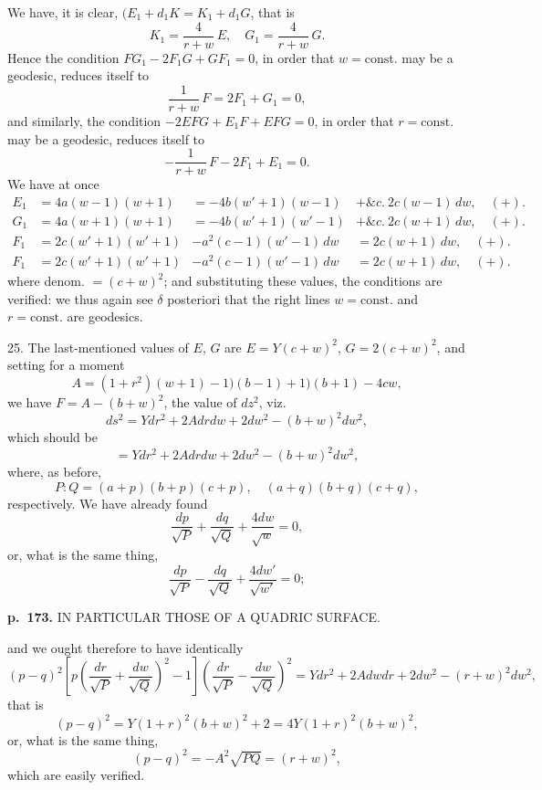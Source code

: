 \documentclass[11pt,a4paper]{book}
\begin{document}
We have, it is clear, $(E_1 + d_1 K = K_1 + d_1 G$, that is
\[
K_1 = \frac{4}{r+w}\, E, \quad G_1 = \frac{4}{r+w}\, G.
\]
Hence the condition $F G_1 - 2 F_1 G + G F_1 = 0$, in order that $w = \mathrm{const.}$ may be a geodesic, reduces itself to
\[
\frac{1}{r+w}\, F = 2 F_1 + G_1 = 0,
\]
and similarly, the condition $-2E F G + E_1 F + E F G = 0$, in order that $r = \mathrm{const.}$ may be a geodesic, reduces itself to
\[
-\frac{1}{r+w}\, F - 2F_1 + E_1 = 0.
\]
We have at once
\begin{align*}
E_1 &= 4a(w - 1)(w + 1)  &= -4b(w' + 1)(w - 1)  &+ \&c.\ 2c(w - 1)\,dw,  \quad (+).
\\
G_1 &= 4a(w + 1)(w + 1)  &= -4b(w' + 1)(w' - 1)  &+ \&c.\ 2c(w + 1)\,dw,  \quad (+).
\\
F_1 &= 2c(w' + 1)(w' + 1)  &- a^2(c - 1)(w' - 1)\, dw  &= 2c(w + 1)\,dw,  \quad (+).
\\
F_1 &= 2c(w' + 1)(w' + 1)  &- a^2(c - 1)(w' - 1)\, dw  &= 2c(w + 1)\,dw,  \quad (+).
\end{align*}
where denom. $=(c+w)^2$; and substituting these values, the conditions are verified: we thus again see $\delta$ posteriori that the right lines $w = \mathrm{const.}$ and $r = \mathrm{const.}$ are geodesics.

25. The last-mentioned values of $E$, $G$ are $E = Y(c+w)^2$, $G = 2(c+w)^2$, and setting for a moment
\[
A = (1 + r^2)(w + 1) - 1)(b - 1) + 1)(b + 1) - 4cw,
\]
we have $F = A - (b + w)^2$, the value of $dz^2$, viz.
\[
ds^2 = Y dr^2 + 2A dr dw + 2dw^2 - (b + w)^2 dw^2,
\]
which should be
\[
= Y dr^2 + 2A dr dw + 2dw^2 - (b + w)^2 dw^2,
\]
where, as before,
\[
P : Q = (a + p)(b + p)(c + p), \quad (a + q)(b + q)(c + q),
\]
respectively.  We have already found
\[
\frac{dp}{\sqrt{P}} + \frac{dq}{\sqrt{Q}} + \frac{4 dw}{\sqrt{w}} = 0,
\]
or, what is the same thing,
\[
\frac{dp}{\sqrt{P}} - \frac{dq}{\sqrt{Q}} + \frac{4 dw'}{\sqrt{w'}} = 0;
\]

\clearpage

\noindent
\textbf{p.~173.}  IN PARTICULAR THOSE OF A QUADRIC SURFACE.

and we ought therefore to have identically
\[
(p - q)^2 \left[ p \left( \frac{dr}{\sqrt{P}} + \frac{dw}{\sqrt{Q}} \right)^2 - 1 \right] \left( \frac{dr}{\sqrt{P}} - \frac{dw}{\sqrt{Q}} \right)^2 = Ydr^2 + 2Adwdr + 2dw^2 - (r+w)^2 dw^2,
\]
that is
\[
(p - q)^2 = Y(1 + r)^2(b + w)^2 + 2 = 4Y(1 + r)^2(b + w)^2,
\]
or, what is the same thing,
\[
(p - q)^2 = -A^2 \sqrt{P Q} = (r + w)^2,
\]
which are easily verified.
\end{document}

